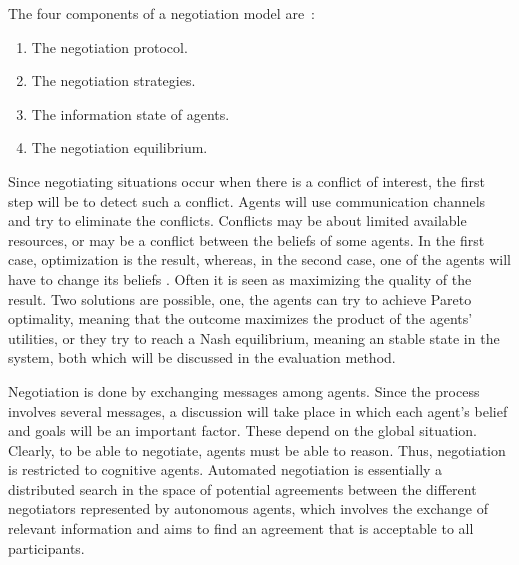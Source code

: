 The four components of a negotiation model are~\citep{fatima2004agenda}:
\begin{enumerate}
	\item The negotiation protocol.
	\item The negotiation strategies.
	\item The information state of agents.
	\item The negotiation equilibrium.
\end{enumerate}

Since negotiating situations occur when there is a conflict of interest, the first step will be to detect such a conflict. Agents will use communication channels and try to eliminate the conflicts. Conflicts may be about limited available resources, or may be a conflict between the beliefs of some agents. In the first case, optimization is the result, whereas, in the second case, one of the agents will have to change its beliefs \citep{shen2003multi}. Often it is seen as maximizing the quality of the result. Two solutions are possible, one, the agents can try to achieve Pareto optimality, meaning that the outcome maximizes the product of the agents' utilities, or they try to reach a Nash equilibrium, meaning an stable state in the system, both which will be discussed in the evaluation method.

Negotiation is done by exchanging messages among agents. Since the process involves several messages, a discussion will take place in which each agent's belief and goals will be an important factor. These depend on the global situation. Clearly, to be able to negotiate, agents must be able to reason. Thus, negotiation is restricted to cognitive agents. Automated negotiation is essentially a distributed search in the space of potential agreements between the different negotiators represented by autonomous agents, which involves the exchange of relevant information and aims to find an agreement that is acceptable to all participants.

